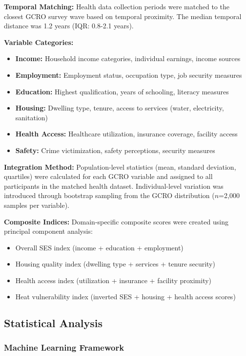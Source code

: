 \documentclass[11pt,a4paper]{article}
\begin{document}
\textbf{Temporal Matching:} Health data collection periods were matched to the closest GCRO survey wave based on temporal proximity. The median temporal distance was 1.2 years (IQR: 0.8-2.1 years).

\textbf{Variable Categories:}
\begin{itemize}
\item \textbf{Income:} Household income categories, individual earnings, income sources
\item \textbf{Employment:} Employment status, occupation type, job security measures
\item \textbf{Education:} Highest qualification, years of schooling, literacy measures
\item \textbf{Housing:} Dwelling type, tenure, access to services (water, electricity, sanitation)
\item \textbf{Health Access:} Healthcare utilization, insurance coverage, facility access
\item \textbf{Safety:} Crime victimization, safety perceptions, security measures
\end{itemize}

\textbf{Integration Method:} Population-level statistics (mean, standard deviation, quartiles) were calculated for each GCRO variable and assigned to all participants in the matched health dataset. Individual-level variation was introduced through bootstrap sampling from the GCRO distribution ($n$=2,000 samples per variable).

\textbf{Composite Indices:} Domain-specific composite scores were created using principal component analysis:
\begin{itemize}
\item Overall SES index (income + education + employment)
\item Housing quality index (dwelling type + services + tenure security)
\item Health access index (utilization + insurance + facility proximity)
\item Heat vulnerability index (inverted SES + housing + health access scores)
\end{itemize}

\subsection{Statistical Analysis}

\subsubsection{Machine Learning Framework}
\end{document}
